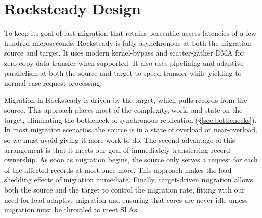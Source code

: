 
\section{Rocksteady Design}
\label{sec:new-design}


To keep its goal of fast migration that retains \nnnth percentile
access latencies of a few hundred microseconds, Rocksteady is fully
asynchronous at both the migration source and target. It uses modern kernel-bypass and
scatter-gather DMA for zero-copy data transfer when supported. It also uses
pipelining and adaptive parallelism at both the source and target to speed
transfer while yielding to normal-case request processing.

Migration in Rocksteady is driven by the target, which pulls records from
the source. This approach places most of the complexity, work, and state
on the target,
eliminating the bottleneck of synchronous replication
(\S\ref{sec:bottlenecks}). In most migration scenarios, the source
is in a state of overload or near-overload, so we must avoid giving it
 more work to do.
The second advantage of this arrangement is that it meets
our goal of immediately transferring record ownership. As soon as
migration begins, the source only serves a request for each of
the affected records at most once more. This approach makes the
load-shedding effects
of migration immediate.
Finally, target-driven migration allows both the
source and the target to control the migration rate, fitting with our need
for load-adaptive migration and ensuring that cores are never idle unless
migration must be throttled to meet SLAs.

